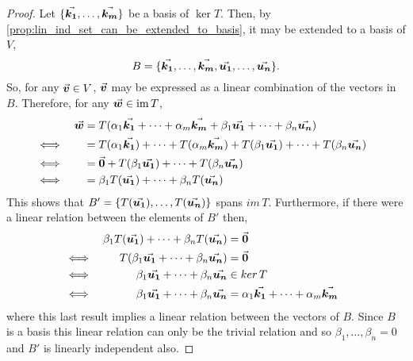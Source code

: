 \documentclass[../MathsNotesBase.tex]{subfiles}
\begin{document}
{		\bigskip
		\begin{proof}
			Let ${ \{\vec{\bm{k_1}}, \dots, \vec{\bm{k_m}}\} }$ be a basis of ${ \operatorname{ker} T }$. Then, by \autoref{prop:lin_ind_set_can_be_extended_to_basis}, it may be extended to a basis of $V$,
			\[ B = \{\vec{\bm{k_1}}, \dots, \vec{\bm{k_m}}, \vec{\bm{u_1}}, \dots, \vec{\bm{u_n}}\}. \]
			So, for any ${ \vec{\bm{v}} \in V }$, $\vec{\bm{v}}$ may be expressed as a linear combination of the vectors in $B$. Therefore, for any ${ \vec{\bm{w}} \in \operatorname{im} T }$,
			\begin{align*}
			&& \vec{\bm{w}} &= T(\alpha_1\vec{\bm{k_1}} + \cdots + \alpha_m\vec{\bm{k_m}} + \beta_1\vec{\bm{u_1}} + \cdots + \beta_n\vec{\bm{u_n}})  \\
			&\iff &  &= T(\alpha_1\vec{\bm{k_1}}) + \cdots + T(\alpha_m\vec{\bm{k_m}}) + T(\beta_1\vec{\bm{u_1}}) + \cdots + T(\beta_n\vec{\bm{u_n}}) &\\
			&\iff &  &= \vec{\bm{0}} + T(\beta_1\vec{\bm{u_1}}) + \cdots + T(\beta_n\vec{\bm{u_n}})   &\text{\scriptsize{}} \\
			&\iff &  &= \beta_1T(\vec{\bm{u_1}}) + \cdots + \beta_nT(\vec{\bm{u_n}})   &\text{\scriptsize{}} \\
			\end{align*}
			This shows that ${ B' = \{T(\vec{\bm{u_1}}), \dots, T(\vec{\bm{u_n}})\} }$ spans $im\,T$. Furthermore, if there were a linear relation between the elements of $B'$ then,
			\begin{align*}
			&& \beta_1T(\vec{\bm{u_1}}) + \cdots + \beta_nT(\vec{\bm{u_n}}) &= \vec{\bm{0}} \\
			&\iff & T(\beta_1\vec{\bm{u_1}} + \cdots + \beta_n\vec{\bm{u_n}}) &= \vec{\bm{0}} & \\
			&\iff & \beta_1\vec{\bm{u_1}} + \cdots + \beta_n\vec{\bm{u_n}} &\in ker\,T &\text{\scriptsize{}} \\
			&\iff & \beta_1\vec{\bm{u_1}} + \cdots + \beta_n\vec{\bm{u_n}} &= \alpha_1\vec{\bm{k_1}} + \cdots + \alpha_m\vec{\bm{k_m}} &\text{\scriptsize{}} \\
			\end{align*}
			where this last result implies a linear relation between the vectors of $B$. Since $B$ is a basis this linear relation can only be the trivial relation and so ${ \beta_1, \dots, \beta_n = 0 }$ and $B'$ is linearly independent also.
		\end{proof}
		
}
\end{document}
